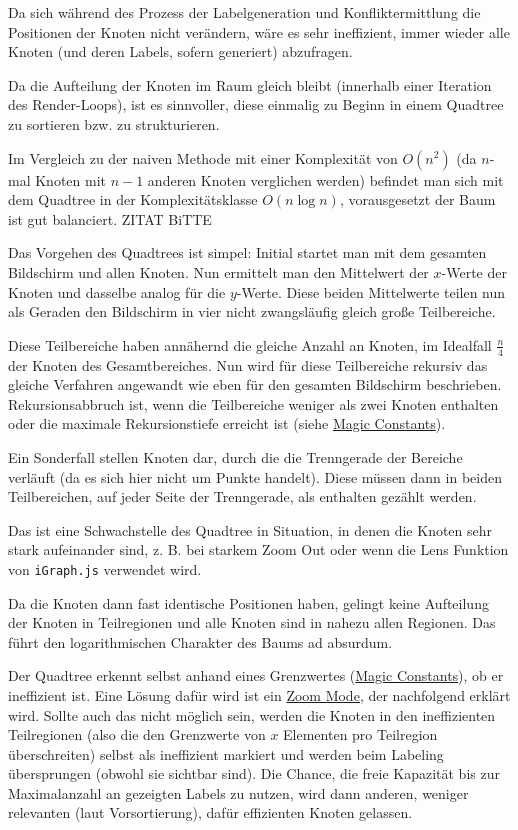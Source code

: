 
Da sich während des Prozess der Labelgeneration und Konfliktermittlung die Positionen der Knoten nicht verändern, wäre es sehr ineffizient,
immer wieder alle Knoten (und deren Labels, sofern generiert) abzufragen.

Da die Aufteilung der Knoten im Raum gleich bleibt (innerhalb einer Iteration des Render-Loops), ist es sinnvoller, diese einmalig zu Beginn
in einem Quadtree zu sortieren bzw. zu strukturieren.

Im Vergleich zu der naiven Methode mit einer Komplexität von $O(n^2)$ (da $n$-mal Knoten mit $n-1$ anderen Knoten verglichen werden) befindet man sich mit dem Quadtree in der Komplexitätsklasse
$O(n \log n)$, vorausgesetzt der Baum ist gut balanciert. ZITAT BiTTE

Das Vorgehen des Quadtrees ist simpel: Initial startet man mit dem gesamten Bildschirm und allen Knoten.
Nun ermittelt man den Mittelwert der $x$-Werte der Knoten und dasselbe analog für die $y$-Werte.
Diese beiden Mittelwerte teilen nun als Geraden den Bildschirm in vier nicht zwangsläufig gleich große Teilbereiche.

Diese Teilbereiche haben annähernd die gleiche Anzahl an Knoten, im Idealfall $\frac{n}{4}$ der Knoten des Gesamtbereiches.
Nun wird für diese Teilbereiche rekursiv das gleiche Verfahren angewandt wie eben für den gesamten Bildschirm beschrieben.
Rekursionsabbruch ist, wenn die Teilbereiche weniger als zwei Knoten enthalten oder die maximale Rekursionstiefe erreicht ist (siehe \hyperref[sec:consts]{Magic Constants}).

Ein Sonderfall stellen Knoten dar, durch die die Trenngerade der Bereiche verläuft (da es sich hier nicht um Punkte handelt).
Diese müssen dann in beiden Teilbereichen, auf jeder Seite der Trenngerade, als enthalten gezählt werden.

Das ist eine Schwachstelle des Quadtree in Situation, in denen die Knoten sehr stark aufeinander sind,
z. B. bei starkem Zoom Out oder wenn die Lens Funktion von \texttt{iGraph.js} verwendet wird.

Da die Knoten dann fast identische Positionen haben, gelingt keine Aufteilung der Knoten in Teilregionen und alle Knoten sind in nahezu allen Regionen.
Das führt den logarithmischen Charakter des Baums ad absurdum.

Der Quadtree erkennt selbst anhand eines Grenzwertes (\hyperref[sec:consts]{Magic Constants}), ob er ineffizient ist.
Eine Lösung dafür wird ist ein \hyperref[subsec:zoom]{Zoom Mode}, der nachfolgend erklärt wird.
Sollte auch das nicht möglich sein, werden die Knoten in den ineffizienten Teilregionen (also die den Grenzwerte von $x$ Elementen pro Teilregion überschreiten) selbst als ineffizient markiert
und werden beim Labeling übersprungen (obwohl sie sichtbar sind). Die Chance, die freie Kapazität bis zur Maximalanzahl an gezeigten Labels zu nutzen,
wird dann anderen, weniger relevanten (laut Vorsortierung), dafür effizienten Knoten gelassen.

